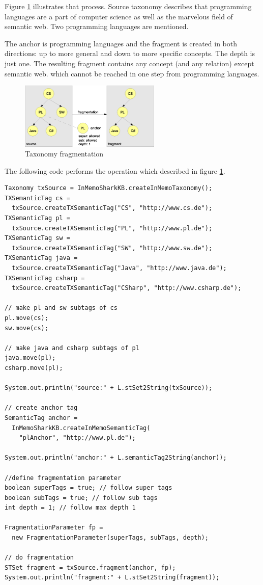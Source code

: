 Figure \ref{fig:taxonomyFragmentation} illustrates that process. Source taxonomy describes that programming languages are a part of computer science as well as
the marvelous field of semantic web. Two programming languages are mentioned.

The anchor is programming languages and the fragment is created in both directions: up to more general and down to more specific concepts. The depth is just one. The resulting fragment contains any concept (and any relation) except semantic web. which cannot be reached in one step from programming languages.

\begin{figure}[t]
\centering
\includegraphics[width=0.60\textwidth]{taxonomyFragmentation.eps}
\caption{Taxonomy fragmentation}
\label{fig:taxonomyFragmentation}
\end{figure}

The following code performs the operation which described in figure \ref{fig:taxonomyFragmentation}.

\begin{verbatim}
Taxonomy txSource = InMemoSharkKB.createInMemoTaxonomy();
TXSemanticTag cs =
  txSource.createTXSemanticTag("CS", "http://www.cs.de");
TXSemanticTag pl =
  txSource.createTXSemanticTag("PL", "http://www.pl.de");
TXSemanticTag sw =
  txSource.createTXSemanticTag("SW", "http://www.sw.de");
TXSemanticTag java =
  txSource.createTXSemanticTag("Java", "http://www.java.de");
TXSemanticTag csharp =
  txSource.createTXSemanticTag("CSharp", "http://www.csharp.de");

// make pl and sw subtags of cs
pl.move(cs);
sw.move(cs);

// make java and csharp subtags of pl
java.move(pl);
csharp.move(pl);

System.out.println("source:" + L.stSet2String(txSource));

// create anchor tag
SemanticTag anchor =
  InMemoSharkKB.createInMemoSemanticTag(
    "plAnchor", "http://www.pl.de");

System.out.println("anchor:" + L.semanticTag2String(anchor));

//define fragmentation parameter
boolean superTags = true; // follow super tags
boolean subTags = true; // follow sub tags
int depth = 1; // follow max depth 1

FragmentationParameter fp =
  new FragmentationParameter(superTags, subTags, depth);

// do fragmentation
STSet fragment = txSource.fragment(anchor, fp);
System.out.println("fragment:" + L.stSet2String(fragment));
\end{verbatim}


